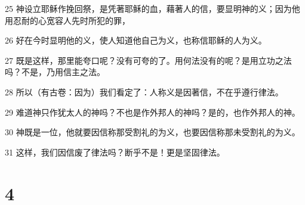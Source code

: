\par 25 神设立耶稣作挽回祭，是凭著耶稣的血，藉著人的信，要显明神的义；因为他用忍耐的心宽容人先时所犯的罪，
\par 26 好在今时显明他的义，使人知道他自己为义，也称信耶稣的人为义。
\par 27 既是这样，那里能夸口呢？没有可夸的了。用何法没有的呢？是用立功之法吗？不是，乃用信主之法。
\par 28 所以（有古卷：因为）我们看定了：人称义是因著信，不在乎遵行律法。
\par 29 难道神只作犹太人的神吗？不也是作外邦人的神吗？是的，也作外邦人的神。
\par 30 神既是一位，他就要因信称那受割礼的为义，也要因信称那未受割礼的为义。
\par 31 这样，我们因信废了律法吗？断乎不是！更是坚固律法。

\chapter{4}


